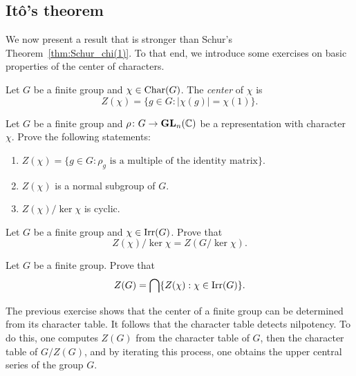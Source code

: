 \subsection{It\^o's theorem}

We now present a result that is stronger than Schur’s Theorem~\ref{thm:Schur_chi(1)}.
To that end, we introduce some exercises on basic properties of the center of characters.

\begin{definition}
    Let $G$ be a finite group and $\chi\in\operatorname{Char}(G)$. 
    The \emph{center} of $\chi$ is
    \[
    Z(\chi)=\{g\in G:|\chi(g)|=\chi(1)\}.
    \]
\end{definition}

\begin{exercise}
\label{xca:center}
    Let $G$ be a finite group and $\rho\colon G\to\mathbf{GL}_n(\mathbb{C})$ be a representation with character 
    $\chi$. Prove the following statements: 
    \begin{enumerate}
        \item $Z(\chi)=\{g\in G:\rho_g\text{ is a multiple of the identity matrix}\}$. 
        \item $Z(\chi)$ is a normal subgroup of $G$. 
        \item $Z(\chi)/\ker\chi$ is cyclic.
    \end{enumerate}
\end{exercise}


\begin{exercise}
\label{xca:center_quotient}
    Let $G$ be a finite group and $\chi\in\operatorname{Irr}(G)$. 
    Prove that 
    \[
    Z(\chi)/\ker\chi=Z(G/\ker\chi).
    \]
\end{exercise}

\begin{exercise}
\label{xca:center_ofG}
    Let $G$ be a finite group. Prove that
    \[
    Z(G)=\bigcap\{Z(\chi):\chi\in\operatorname{Irr}(G)\}.
    \]
\end{exercise}

The previous exercise shows that the center of a finite group can be determined
from its character table. It follows that the character table detects
nilpotency. To do this, one computes $Z(G)$ from the character table of $G$, then
the character table of $G/Z(G)$, and by iterating this process, one obtains the
upper central series of the group $G$. 

